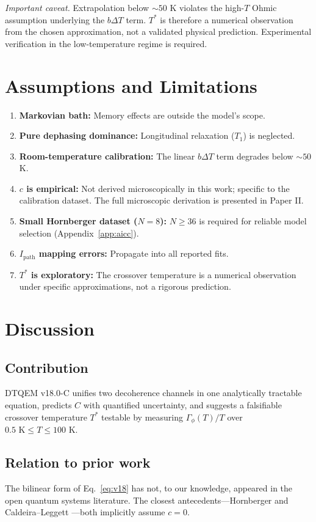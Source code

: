 \documentclass[aps,pra,reprint,amsmath,amssymb,superscriptaddress]{revtex4-2}
\begin{document}
\noindent\textit{Important caveat.} Extrapolation below $\sim 50$ K violates the high-$T$ Ohmic assumption underlying the $b\Delta T$ term. $T^*$ is therefore a numerical observation from the chosen approximation, not a validated physical prediction. Experimental verification in the low-temperature regime is required.

\section{Assumptions and Limitations}
\begin{enumerate}
    \item \textbf{Markovian bath:} Memory effects are outside the model's scope.
    \item \textbf{Pure dephasing dominance:} Longitudinal relaxation ($T_1$) is neglected.
    \item \textbf{Room-temperature calibration:} The linear $b\Delta T$ term degrades below $\sim 50$ K.
    \item \textbf{$c$ is empirical:} Not derived microscopically in this work; specific to the calibration dataset. The full microscopic derivation is presented in Paper II.
    \item \textbf{Small Hornberger dataset ($N=8$):} $N \geq 36$ is required for reliable model selection (Appendix~\ref{app:aicc}).
    \item \textbf{$I_{\text{path}}$ mapping errors:} Propagate into all reported fits.
    \item \textbf{$T^*$ is exploratory:} The crossover temperature is a numerical observation under specific approximations, not a rigorous prediction.
\end{enumerate}

\section{Discussion}
\subsection{Contribution}
DTQEM v18.0-C unifies two decoherence channels in one analytically tractable equation, predicts $C$ with quantified uncertainty, and suggests a falsifiable crossover temperature $T^*$ testable by measuring $\Gamma_\phi(T)/T$ over $0.5 \text{ K} \leq T \leq 100 \text{ K}$.

\subsection{Relation to prior work}
The bilinear form of Eq.~\eqref{eq:v18} has not, to our knowledge, appeared in the open quantum systems literature. The closest antecedents---Hornberger \cite{Hornberger2003} and Caldeira--Leggett \cite{Weiss2012}---both implicitly assume $c=0$.
\end{document}
